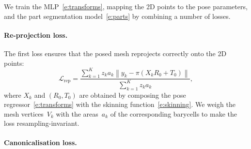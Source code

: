 We train the MLP~\eqref{e:transforms}, mapping the 2D points to the pose parameters, and the part segmentation model~\eqref{e:parts} by combining a number of losses.


\paragraph{Re-projection loss.}

The first loss ensures that the posed mesh reprojects correctly onto the 2D points:
\begin{equation}\label{e:rep}
\mathcal{L}_\text{rep}
=
\frac{\sum_{k=1}^K 
z_k a_k
\left \|
y_k - \pi\left(X_k R_0 + T_0 \right)
\right \|}
{\sum_{k=1}^K z_k a_k},
\end{equation}
where $X_k$ and $(R_0,T_0)$ are obtained by composing the pose regressor~\eqref{e:transforms} with the skinning function~\eqref{e:skinning}.
We weigh the mesh vertices~$V_k$ with the areas~$a_k$ of the corresponding barycells to make the loss resampling-invariant.

\paragraph{Canonicalisation loss.}


